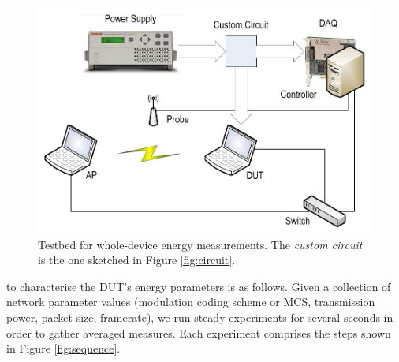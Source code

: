 \documentclass[twoside,nohyper]{tufte-book}
\theoremstyle{definition}
\theoremstyle{definition}
\theoremstyle{definition}
\theoremstyle{remark}
\begin{document}
\begin{figure}

{\centering \includegraphics{img/03/testbed} 

}

\caption[Testbed for whole-device energy measurements. The
\emph{custom circuit} is the one sketched in Figure \ref{fig:circuit}.]{Testbed for whole-device energy measurements. The
\emph{custom circuit} is the one sketched in Figure \ref{fig:circuit}.}\label{fig:testbed}
\end{figure}

 to characterise the DUT's
energy parameters is as follows. Given a collection of network parameter
values (modulation coding scheme or MCS, transmission power, packet
size, framerate), we run steady experiments for several seconds in order
to gather averaged measures. Each experiment comprises the steps shown
in Figure \ref{fig:sequence}.
\end{document}
